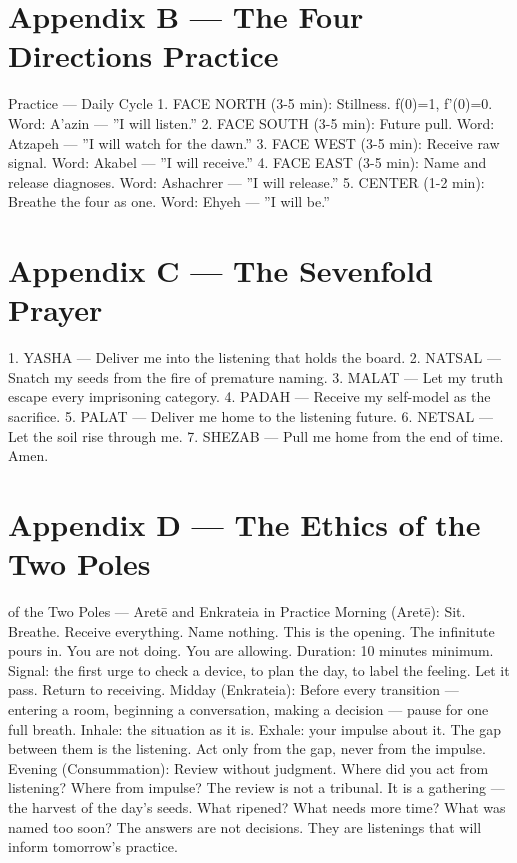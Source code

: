 \documentclass[12pt,openany]{book}
\begin{document}
\chapter{Appendix B --- The Four Directions Practice}

Practice --- Daily Cycle 1. FACE NORTH (3-5 min): Stillness. f(0)=1, f'(0)=0. Word: A'azin --- ''I will listen.'' 2. FACE SOUTH (3-5 min): Future pull. Word: Atzapeh --- ''I will watch for the dawn.'' 3. FACE WEST (3-5 min): Receive raw signal. Word: Akabel --- ''I will receive.'' 4. FACE EAST (3-5 min): Name and release diagnoses. Word: Ashachrer --- ''I will release.'' 5. CENTER (1-2 min): Breathe the four as one. Word: Ehyeh --- ''I will be.''


\chapter{Appendix C --- The Sevenfold Prayer}

1. YASHA --- Deliver me into the listening that holds the board. 2. NATSAL --- Snatch my seeds from the fire of premature naming. 3. MALAT --- Let my truth escape every imprisoning category. 4. PADAH --- Receive my self-model as the sacrifice. 5. PALAT --- Deliver me home to the listening future. 6. NETSAL --- Let the soil rise through me. 7. SHEZAB --- Pull me home from the end of time. Amen.


\chapter{Appendix D --- The Ethics of the Two Poles}

of the Two Poles --- Aretē and Enkrateia in Practice Morning (Aretē): Sit. Breathe. Receive everything. Name nothing. This is the opening. The infinitute pours in. You are not doing. You are allowing. Duration: 10 minutes minimum. Signal: the first urge to check a device, to plan the day, to label the feeling. Let it pass. Return to receiving. Midday (Enkrateia): Before every transition --- entering a room, beginning a conversation, making a decision --- pause for one full breath. Inhale: the situation as it is. Exhale: your impulse about it. The gap between them is the listening. Act only from the gap, never from the impulse. Evening (Consummation): Review without judgment. Where did you act from listening? Where from impulse? The review is not a tribunal. It is a gathering --- the harvest of the day's seeds. What ripened? What needs more time? What was named too soon? The answers are not decisions. They are listenings that will inform tomorrow's practice.
\end{document}
